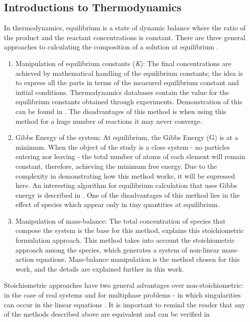 \documentclass[ppgc,mestrado,english]{iiufrgs}
\begin{document}
\subsection{Introductions to Thermodynamics}
In thermodynamics, equilibrium is a state of dynamic balance where the ratio of the product and the reactant concentrations is constant. There are three general approaches to calculating the composition of a solution at equilibrium \cite{Petrucci:07}.
\begin{enumerate}
\item Manipulation of equilibrium constants (\emph{K}): The final concentrations are achieved by mathematical handling of the equilibrium constants; the idea is to express all the parts in terms of the measured equilibrium constant and initial conditions. Thermodynamics databases contain the value for the equilibrium constants obtained through experiments. Demonstration of this can be found in \cite{Kehew:00}. The disadvantages of this method is when using this method for a huge number of reactions it may never converge.
\item Gibbs Energy of the system: At equilibrium, the Gibbs Energy (G) is at a minimum. When the object of the study is a close system - no particles entering nor leaving - the total number of atoms of each element will remain constant, therefore, achieving the minimum free energy. Due to the complexity in demonstrating how this method works, it will be supressed here. An interesting algorithm for equilibrium calculation that uses Gibbs energy is described in \cite{Allan:15}. One of the disadvantages of this method lies in the effect of species which appear only in tiny quantities at equilibrium.
\item Manipulation of mass-balance: The total concentration of species that compose the system is the base for this method, \cite{Smith:80} explains this stoichiometric formulation approach. This method takes into account the stoichiometric approach among the species, which generates a system of non-linear mass-action equations. Mass-balance manipulation is the method chosen for this work, and the details are explained further in this work.
\end{enumerate}

Stoichiometric approaches have two general advantages over non-stoichiometric: in the case of real systems and for multiphase problems - in which singularities can occur in the linear equations \cite{Smith:80}. It is important to remind the reader that any of the methods described above are equivalent and can be verified in \cite{Zeggeren:70}
\end{document}

